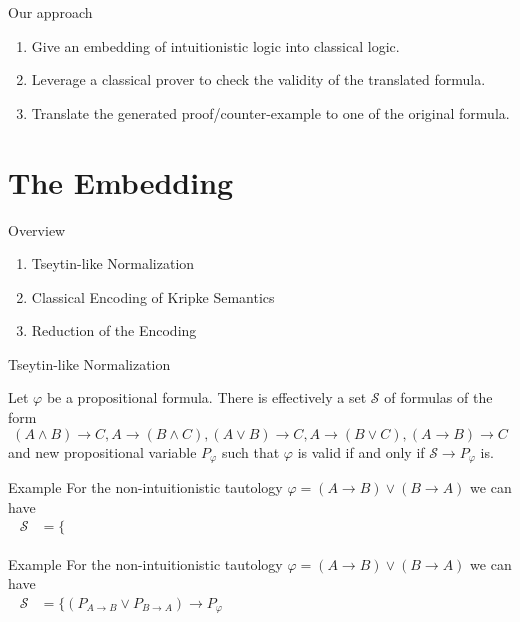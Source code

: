 \documentclass{cubeamer}
\begin{document}
	\begin{frame}{Our approach}
		\begin{enumerate}
			\item Give an embedding of intuitionistic logic into classical logic.
			\item Leverage a classical prover to check the validity of the translated formula.
			\item Translate the generated proof/counter-example to one of the original formula.
		\end{enumerate}
	\end{frame}
	
	\section{The Embedding}
	
	\begin{frame}{Overview}
		\begin{enumerate}
			\item Tseytin-like Normalization
			\item Classical Encoding of Kripke Semantics
			\item Reduction of the Encoding
		\end{enumerate}
	\end{frame}

	\begin{frame}{Tseytin-like Normalization}
			\begin{lemma}
				Let $\varphi$ be a propositional formula. There is effectively a set $\mathcal S$ of formulas of the form $$(A\wedge B)\to C, A\to (B\wedge C), (A\vee B)\to C, A\to (B\vee C), (A\to B)\to C$$ and new propositional variable $P_\varphi$ such that $\varphi$ is valid if and only if $\mathcal S\to P_\varphi$ is.
			\end{lemma}	
	\end{frame}

	\begin{frame}{Example}
		For the non-intuitionistic tautology $\varphi = (A\to B)\vee (B\to A)$ we can have
		\begin{align*}
			\mathcal S &= \{\phantom{(P_{A\to B}\vee P_{B\to A})\to P_\varphi, (A\to B)\to P_{A\to B}, (B\to A)\to P_{B\to A}\}}
		\end{align*}
	\end{frame}

	\begin{frame}{Example}
		For the non-intuitionistic tautology $\varphi = (A\to B)\vee (B\to A)$ we can have
		\begin{align*}
			\mathcal S &= \{(P_{A\to B}\vee P_{B\to A})\to P_\varphi\phantom{, (A\to B)\to P_{A\to B}, (B\to A)\to P_{B\to A}\}}
		\end{align*}
	\end{frame}
\end{document}
